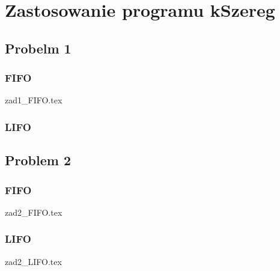 \documentclass{article}
\begin{document}
\section      %
                {Zastosowanie programu kSzereg}
       
\subsection     {Probelm 1}
\subsubsection  {FIFO}

 {zad1_FIFO.tex}
\FloatBarrier
\subsubsection  {LIFO}


\FloatBarrier
\newpage
\subsection     {Problem 2}
\subsubsection  {FIFO}
 {zad2_FIFO.tex}
\FloatBarrier
\subsubsection  {LIFO}
 {zad2_LIFO.tex}
\FloatBarrier

	
\end{document}
